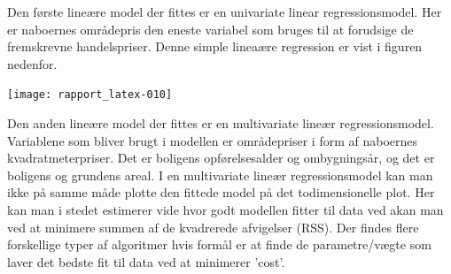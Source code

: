 \documentclass{report}
\begin{document}
Den første lineære model der fittes er en univariate linear regressionsmodel. Her er naboernes områdepris den eneste variabel som bruges til at forudsige de fremskrevne handelspriser. 
Denne simple lineaære regression er vist i figuren nedenfor. 

\texttt{[image: rapport\_latex-010]}

Den anden lineære model der fittes er en multivariate lineær regressionsmodel. 
Variablene som bliver brugt i modellen er områdepriser i form af naboernes kvadratmeterpriser. Det er boligens opførelsesalder og ombygningsår, og det er boligens og grundens areal. 
I en multivariate lineær regressionsmodel kan man ikke på samme måde plotte den fittede model på det todimensionelle plot. Her kan man i stedet estimerer vide hvor godt modellen fitter til data ved akan man ved at minimere summen af de kvadrerede afvigelser (RSS). 
Der findes flere forskellige typer af algoritmer hvis formål er at finde de parametre/vægte som laver det bedste fit til data ved at minimerer 'cost'. 
\end{document}
